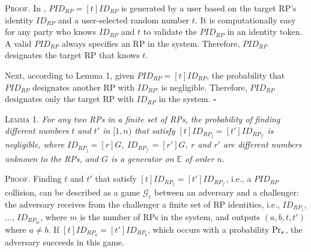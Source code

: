 \vspace{0.75mm}
\noindent\textsc{Proof.} In \usso, $PID_{RP}=[t]ID_{RP}$ is generated by a user based on the target RP's identity $ID_{RP}$ and a user-selected random number $t$.
It is computationally easy for any party who knows $ID_{RP}$ and $t$ to validate the $PID_{RP}$ in an identity token. A valid $PID_{RP}$ always specifies an RP in the system. %
Therefore, $PID_{RP}$ designates the target RP that knows $t$.

Next, according to Lemma 1, given $PID_{RP} = [t]ID_{RP}$, the probability that $PID_{RP}$ designates another RP with $ID_{RP'}$ is negligible. %
Therefore, $PID_{RP}$ designates only the target RP with $ID_{RP}$ in the system.  \hfill $\square$

\vspace{3mm}
\noindent\textsc{Lemma 1.} {\em  For any two RPs in a finite set of RPs, the probability of finding different numbers $t$ and $t'$ in $[1,n)$ that satisfy $[t]ID_{RP_j} = [t']ID_{RP_{j'}}$ is negligible, where $ID_{RP_j}=[r]G$, $ID_{RP_{j'}}=[r']G$, $r$ and $r'$ are different numbers unknown to the RPs, and $G$ is a generator on $\mathbb{E}$ of order $n$.}


\oldc
\vspace{0.75mm}
\noindent\textsc{Proof.}
Finding $t$ and $t'$ that satisfy $[t]ID_{RP_j} = [t']ID_{RP_{j'}}$, i.e., a $PID_{RP}$ collision, can be described as a game $\mathcal{G}_c$ between an adversary and a challenger: the adversary receives from the challenger a finite set of RP identities, i.e., $ID_{RP_1}$, ..., $ID_{RP_m}$, where $m$ is the number of RPs in the system, and outputs $(a, b, t, t')$ where $a \neq b$. If $[t]ID_{RP_a}=[t']ID_{RP_b}$, which occurs with a probability ${\rm Pr}_s$, the adversary succeeds in this game.

